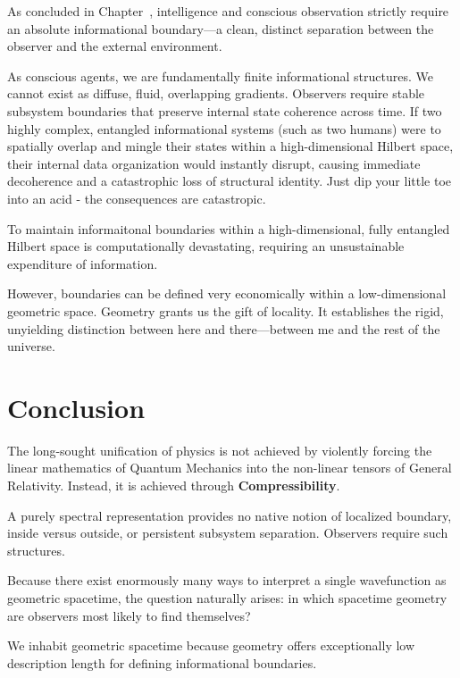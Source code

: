 As concluded in Chapter~, intelligence and conscious observation strictly require an absolute informational boundary—a clean, distinct separation between the observer and the external environment.

As conscious agents, we are fundamentally finite informational structures. We cannot exist as diffuse, fluid, overlapping gradients.
Observers require stable subsystem boundaries that preserve internal state coherence across time.
If two highly complex, entangled informational systems (such as two humans) were to spatially overlap and mingle their states within a high-dimensional Hilbert space, their internal data organization would instantly disrupt, causing immediate decoherence and a catastrophic loss of structural identity. Just dip your little toe into an acid - the consequences are catastropic.

To maintain informaitonal boundaries within a high-dimensional, fully entangled Hilbert space is computationally devastating, requiring an unsustainable expenditure of information.

However, boundaries can be defined very economically within a low-dimensional geometric space.
Geometry grants us the gift of locality.
It establishes the rigid, unyielding distinction between here and there—between me and the rest of the universe.


\section{Conclusion}

The long-sought unification of physics is not achieved by violently forcing the linear mathematics of Quantum Mechanics into the non-linear tensors of General Relativity.
Instead, it is achieved through \textbf{Compressibility}.

A purely spectral representation provides no native notion of localized boundary, inside versus outside, or persistent subsystem separation.
Observers require such structures.

Because there exist enormously many ways to interpret a single wavefunction as geometric spacetime, the question naturally arises: in which spacetime geometry are observers most likely to find themselves?

We inhabit geometric spacetime because geometry offers exceptionally low description length for defining
informational boundaries.

